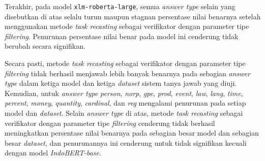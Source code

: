 Terakhir, pada model \texttt{xlm-roberta-large}, semua \emph{answer type} selain yang disebutkan di atas selalu turun maupun stagnan persentase nilai benarnya setelah menggunakan metode \emph{task recasting} sebagai verifikator dengan parameter tipe \emph{filtering}. Penurunan persentase nilai benar pada model ini cenderung tidak berubah secara signifikan.

Secara pasti, metode \emph{task recasting} sebagai verifikator dengan parameter tipe \emph{filtering} tidak berhasil menjawab lebih banyak benarnya pada sebagian \emph{answer type} dalam ketiga model dan ketiga \emph{dataset} sistem tanya jawab yang diuji. Kemudian, untuk \emph{answer type} \emph{person}, \emph{norp}, \emph{gpe}, \emph{prod}, \emph{event}, \emph{law}, \emph{lang}, \emph{time}, \emph{percent}, \emph{money}, \emph{quantity}, \emph{cardinal}, dan \emph{reg} mengalami penurunan pada setiap model dan \emph{dataset}. Selain \emph{answer type} di atas, metode \emph{task recasting} sebagai verifikator dengan parameter tipe \emph{filtering} cenderung tidak berhasil meningkatkan persentase nilai benarnya pada sebagian besar model dan sebagian besar \emph{dataset}, dan penurunannya ini cenderung untuk tidak signifikan kecuali dengan model \emph{IndoBERT-base}. 

